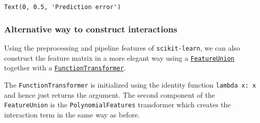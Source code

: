 \documentclass{scrartcl}
\makeatletter
\newcommand{\boxspacing}{\kern\kvtcb@left@rule\kern\kvtcb@boxsep}
\newcommand{\prompt}[4]{
        {\ttfamily\llap{{\color{#2}[#3]:\hspace{3pt}#4}}\vspace{-\baselineskip}}
    }
\makeatother
\begin{document}
            \begin{tcolorbox}[breakable, size=fbox, boxrule=.5pt, pad at break*=1mm, opacityfill=0]
\prompt{Out}{outcolor}{48}{\boxspacing}
\begin{Verbatim}[commandchars=\\\{\}]
Text(0, 0.5, 'Prediction error')
\end{Verbatim}
\end{tcolorbox}
        
    \begin{center}
    \end{center}
    
    \hypertarget{alternative-way-to-construct-interactions}{%
\subsubsection*{Alternative way to construct
interactions}\label{alternative-way-to-construct-interactions}}

Using the preprocessing and pipeline features of \texttt{scikit-learn},
we can also construct the feature matrix in a more elegant way using a
\href{https://scikit-learn.org/stable/modules/generated/sklearn.pipeline.FeatureUnion.html}{\texttt{FeatureUnion}}
together with a
\href{https://scikit-learn.org/stable/modules/generated/sklearn.preprocessing.FunctionTransformer.html}{\texttt{FunctionTransformer}}.

The \texttt{FunctionTransformer} is initialized using the identity
function \texttt{lambda\ x:\ x} and hence just returns the argument. The
second component of the \texttt{FeatureUnion} is the
\texttt{PolynomialFeatures} transformer which creates the interaction
term in the same way as before.
\end{document}
